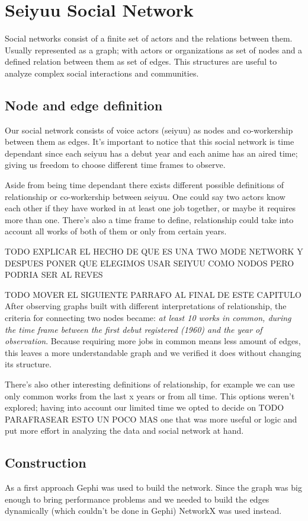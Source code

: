 \chapter{Seiyuu Social Network}
Social networks consist of a finite set of actors and the relations between them. Usually represented as a graph; with actors or organizations as set of nodes and a defined relation between them as set of edges. This structures are useful to analyze complex social interactions and communities.

\section{Node and edge definition}
Our social network consists of voice actors (seiyuu) as nodes and co-workership between them as edges. It's important to notice that this social network is time dependant since each seiyuu has a debut year and each anime has an aired time; giving us freedom to choose different time frames to observe.

Aside from being time dependant there exists different possible definitions of relationship or co-workership between seiyuu. One could say two actors know each other if they have worked in at least one job together, or maybe it requires more than one. There's also a time frame to define, relationship could take into account all works of both of them or only from certain years.

TODO EXPLICAR EL HECHO DE QUE ES UNA TWO MODE NETWORK Y DESPUES PONER QUE ELEGIMOS USAR SEIYUU COMO NODOS PERO PODRIA SER AL REVES

TODO MOVER EL SIGUIENTE PARRAFO AL FINAL DE ESTE CAPITULO
After observing graphs built with different interpretations of relationship, the criteria for connecting two nodes became: \textit{at least 10 works in common, during the time frame between the first debut registered (1960) and the year of observation}.
Because requiring more jobs in common means less amount of edges, this leaves a more understandable graph and we verified it does without changing its structure.

There's also other interesting definitions of relationship, for example we can use only common works from the last x years or from all time. This options weren't explored; having into account our limited time we opted to decide on TODO PARAFRASEAR ESTO UN POCO MAS one that was more useful or logic and put more effort in analyzing the data and social network at hand.

\section{Construction}
As a first approach Gephi was used to build the network. Since the graph was big enough to bring performance problems and we needed to build the edges dynamically (which couldn't be done in Gephi) NetworkX was used instead.

